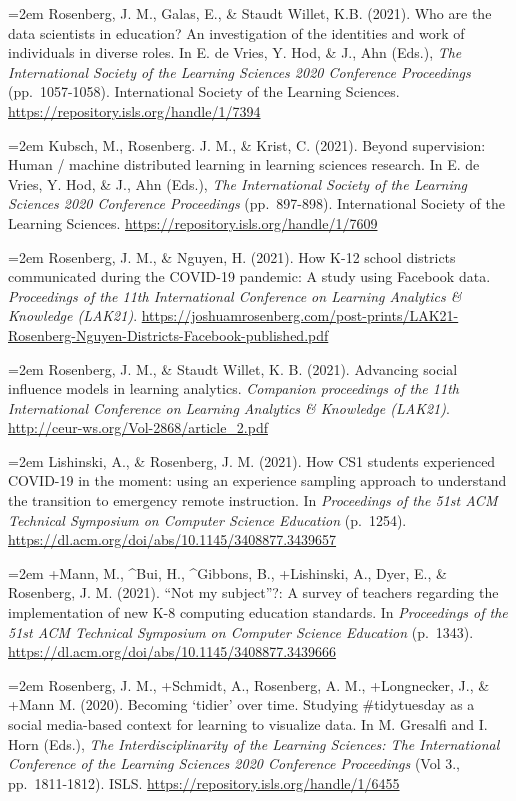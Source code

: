 \documentclass[
  14,
]{article}
\begin{document}
\hangindent=2em Rosenberg, J. M., Galas, E., \& Staudt Willet, K.B.
(2021). Who are the data scientists in education? An investigation of
the identities and work of individuals in diverse roles. In E. de Vries,
Y. Hod, \& J., Ahn (Eds.), \emph{The International Society of the
Learning Sciences 2020 Conference Proceedings} (pp.~1057-1058).
International Society of the Learning Sciences.
\url{https://repository.isls.org/handle/1/7394}

\hangindent=2em Kubsch, M., Rosenberg. J. M., \& Krist, C. (2021).
Beyond supervision: Human / machine distributed learning in learning
sciences research. In E. de Vries, Y. Hod, \& J., Ahn (Eds.), \emph{The
International Society of the Learning Sciences 2020 Conference
Proceedings} (pp.~897-898). International Society of the Learning
Sciences. \url{https://repository.isls.org/handle/1/7609}

\hangindent=2em Rosenberg, J. M., \& Nguyen, H. (2021). How K-12 school
districts communicated during the COVID-19 pandemic: A study using
Facebook data. \emph{Proceedings of the 11th International Conference on
Learning Analytics \& Knowledge (LAK21)}.
\url{https://joshuamrosenberg.com/post-prints/LAK21-Rosenberg-Nguyen-Districts-Facebook-published.pdf}

\hangindent=2em Rosenberg, J. M., \& Staudt Willet, K. B. (2021).
Advancing social influence models in learning analytics. \emph{Companion
proceedings of the 11th International Conference on Learning Analytics
\& Knowledge (LAK21)}. \url{http://ceur-ws.org/Vol-2868/article_2.pdf}

\hangindent=2em Lishinski, A., \& Rosenberg, J. M. (2021). How CS1
students experienced COVID-19 in the moment: using an experience
sampling approach to understand the transition to emergency remote
instruction. In \emph{Proceedings of the 51st ACM Technical Symposium on
Computer Science Education} (p.~1254).
\url{https://dl.acm.org/doi/abs/10.1145/3408877.3439657}

\hangindent=2em +Mann, M., \^{}Bui, H., \^{}Gibbons, B., +Lishinski, A.,
Dyer, E., \& Rosenberg, J. M. (2021). ``Not my subject''?: A survey of
teachers regarding the implementation of new K-8 computing education
standards. In \emph{Proceedings of the 51st ACM Technical Symposium on
Computer Science Education} (p.~1343).
\url{https://dl.acm.org/doi/abs/10.1145/3408877.3439666}

\hangindent=2em Rosenberg, J. M., +Schmidt, A., Rosenberg, A. M.,
+Longnecker, J., \& +Mann M. (2020). Becoming `tidier' over time.
Studying \#tidytuesday as a social media-based context for learning to
visualize data. In M. Gresalfi and I. Horn (Eds.), \emph{The
Interdisciplinarity of the Learning Sciences: The International
Conference of the Learning Sciences 2020 Conference Proceedings} (Vol
3., pp.~1811-1812). ISLS.
\url{https://repository.isls.org/handle/1/6455}
\end{document}
